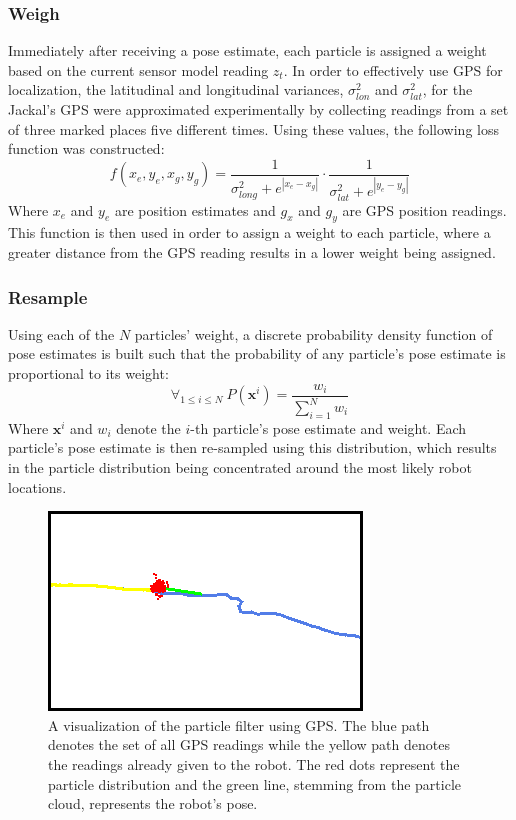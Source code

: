\documentclass[letterpaper, 12 pt, conference]{ieeeconf}  %
\begin{document}
\subsubsection{Weigh}
Immediately after receiving a pose estimate, each particle is assigned a weight based on the current sensor model reading $z_t$. In order to effectively use GPS for localization, the latitudinal and longitudinal variances, $\sigma _{lon}^2$ and $\sigma _{lat}^2$, for the Jackal's GPS were approximated experimentally by collecting readings from a set of three marked places five different times. Using these values, the following loss function was constructed:
$$
f(x_e,y_e,x_g,y_g)= \frac{1}{\sigma _{long}^2 + e^{|x_e-x_g|}}\cdot \frac{1}{\sigma _{lat}^2 + e^{|y_e-y_g|}}
$$
Where $x_e$ and $y_e$ are position estimates and $g_x$ and $g_y$ are GPS position readings. This function is then used in order to assign a weight to each particle, where a greater distance from the GPS reading results in a lower weight being assigned. 
\subsubsection{Resample} 
Using each of the $N$ particles' weight, a discrete probability density function of pose estimates is built such that the probability of any particle's pose estimate is proportional to its weight: 
$$
\forall _{1\leq i \leq N}~P(\textbf{x}^i)=\frac{w_i}{\sum _{i=1} ^N w_i}
$$
Where $\textbf{x}^i$ and $w_i$ denote the $i$-th particle's pose estimate and weight. Each particle's pose estimate is then re-sampled using this distribution, which results in the particle distribution being concentrated around the most likely robot locations.  

\begin{figure}[h]
\centering
\includegraphics[scale=0.70]{particle_filter_visual}
\caption{A visualization of the particle filter using GPS. The blue path denotes the set of all GPS readings while the yellow path denotes the readings already given to the robot. The red dots represent the particle distribution and the green line, stemming from the particle cloud, represents the robot's pose.}
\end{figure}
\end{document}
